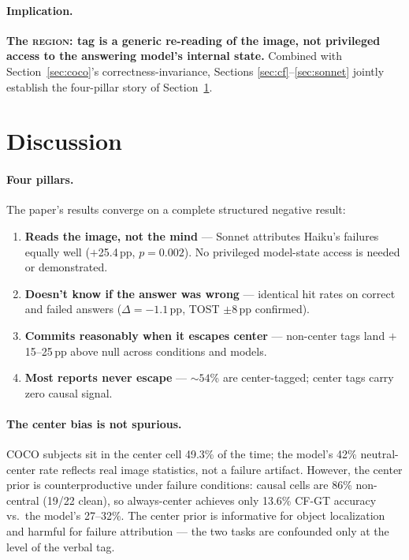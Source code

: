 \documentclass[11pt]{article}
\begin{document}
\paragraph{Implication.}
\textbf{The \textsc{region:} tag is a generic re-reading of the image, not
privileged access to the answering model's internal state.}
Combined with Section~\ref{sec:coco}'s correctness-invariance, Sections
\ref{sec:cf}--\ref{sec:sonnet} jointly establish the four-pillar story of
Section~\ref{sec:discussion}.


\section{Discussion}
\label{sec:discussion}

\paragraph{Four pillars.}
The paper's results converge on a complete structured negative result:

\begin{enumerate}
  \item \textbf{Reads the image, not the mind} — Sonnet attributes Haiku's failures
    equally well ($+$25.4\,pp, $p{=}0.002$).
    No privileged model-state access is needed or demonstrated.
  \item \textbf{Doesn't know if the answer was wrong} — identical hit rates on
    correct and failed answers ($\Delta = -1.1$\,pp, TOST $\pm 8$\,pp confirmed).
  \item \textbf{Commits reasonably when it escapes center} — non-center tags land
    $+$15--25\,pp above null across conditions and models.
  \item \textbf{Most reports never escape} — ${\sim}54$\% are center-tagged;
    center tags carry zero causal signal.
\end{enumerate}

\paragraph{The center bias is not spurious.}
COCO subjects sit in the center cell 49.3\% of the time; the model's 42\%
neutral-center rate reflects real image statistics, not a failure artifact.
However, the center prior is counterproductive under failure conditions:
causal cells are 86\% non-central (19/22 clean), so always-center achieves
only 13.6\% CF-GT accuracy vs.\ the model's 27--32\%.
The center prior is informative for object localization and harmful for
failure attribution — the two tasks are confounded only at the level of the
verbal tag.
\end{document}
